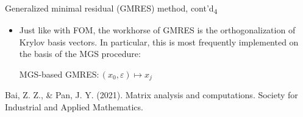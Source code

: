 \documentclass[t,usepdftitle=false]{beamer}
\begin{document}
\begin{frame}{Generalized minimal residual (GMRES) method, cont'd\textsubscript{4}}
\begin{itemize}
\item Just like with FOM, the workhorse of GMRES is the orthogonalization of Krylov basis vectors.
In particular, this is most frequently implemented on the basis of the MGS procedure:\vspace{-.35cm}
\begin{algorithm}[H]
\small
\caption{MGS-based GMRES$:(x_0,\varepsilon)\mapsto x_j$}
\begin{algorithmic}[1]
\ENDFOR
{}
\ENDIF
{}
\ENDFOR
{}
\end{algorithmic}
\end{algorithm}
\end{itemize}
\smallskip
\tiny{Bai, Z. Z., \& Pan, J. Y. (2021). Matrix analysis and computations. Society for Industrial and Applied Mathematics.}
\end{frame}
\end{document}
